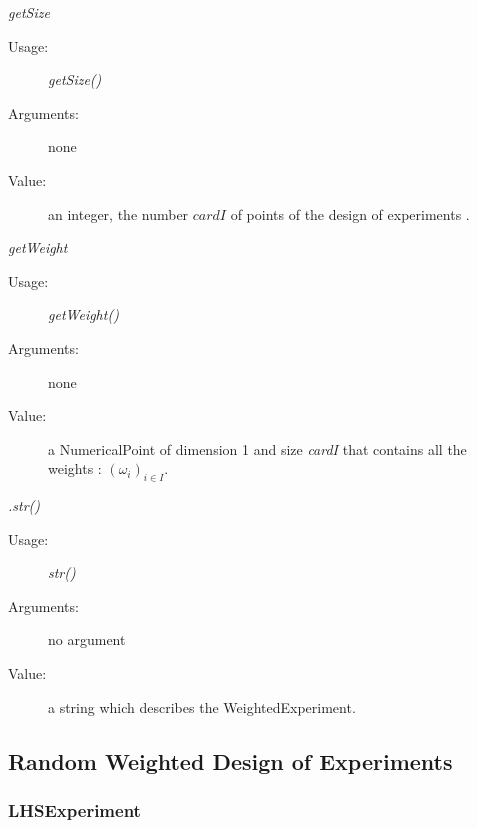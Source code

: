 \begin{description}
\begin{description}
\item \textit{getSize}
\begin{description}
\item[Usage:] \textit{getSize()}
\item[Arguments:] none
\item[Value:] an integer, the number $card I$ of points of the design of experiments .
\end{description}
\bigskip

\item \textit{getWeight}
\begin{description}
\item[Usage:] \textit{getWeight()}
\item[Arguments:] none
\item[Value:] a NumericalPoint of dimension 1 and size \textit{cardI} that contains all the weights : $(\omega_i)_{i \in I}$.
\end{description}
\bigskip

\item \textit{.str()}
\begin{description}
\item[Usage:] \textit{str()}
\item[Arguments:] no argument
\item[Value:] a string which describes the WeightedExperiment.
\end{description}

\end{description}


\item[Links]  \rule{0pt}{1em}

\end{description}




\newpage
\subsection{Random Weighted Design of Experiments}

\subsubsection{LHSExperiment}

